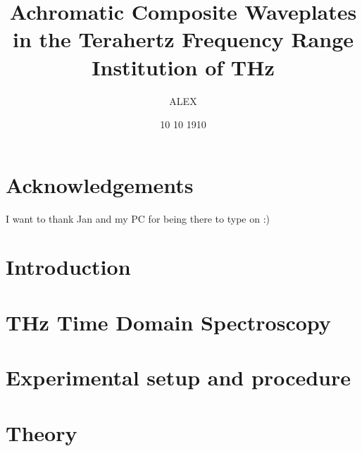 \documentclass[12pt, a4paper]{report}
\title{
{Achromatic Composite Waveplates in the Terahertz Frequency Range}\\
{\large Institution of THz}\\
}
\author{ALEX}
\date{10 10 1910}
\begin{document}
\maketitle




\chapter*{Acknowledgements}
I want to thank Jan and my PC for being there to type on :)




\chapter{Introduction}

\chapter{THz Time Domain Spectroscopy}

\chapter{Experimental setup and procedure}

\chapter{Theory}
\end{document}
